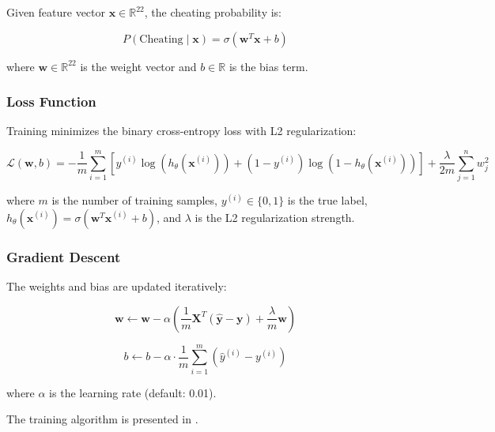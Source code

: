 \documentclass{article}
\begin{document}
Given feature vector $\mathbf{x} \in \mathbb{R}^{22}$, the cheating probability is:

\begin{equation}
    P(\text{Cheating} \mid \mathbf{x}) = \sigma(\mathbf{w}^T \mathbf{x} + b)
    \label{eq:logistic_prediction}
\end{equation}

where $\mathbf{w} \in \mathbb{R}^{22}$ is the weight vector and $b \in \mathbb{R}$ is the bias term.

\subsubsection{Loss Function}

Training minimizes the binary cross-entropy loss with L2 regularization:

\begin{equation}
    \mathcal{L}(\mathbf{w}, b) = -\frac{1}{m} \sum_{i=1}^{m} \left[ y^{(i)} \log(h_\theta(\mathbf{x}^{(i)})) + (1 - y^{(i)}) \log(1 - h_\theta(\mathbf{x}^{(i)})) \right] + \frac{\lambda}{2m} \sum_{j=1}^{n} w_j^2
    \label{eq:cross_entropy}
\end{equation}

where $m$ is the number of training samples, $y^{(i)} \in \{0, 1\}$ is the true label, $h_\theta(\mathbf{x}^{(i)}) = \sigma(\mathbf{w}^T \mathbf{x}^{(i)} + b)$, and $\lambda$ is the L2 regularization strength.

\subsubsection{Gradient Descent}

The weights and bias are updated iteratively:

\begin{equation}
    \mathbf{w} \leftarrow \mathbf{w} - \alpha \left( \frac{1}{m} \mathbf{X}^T (\hat{\mathbf{y}} - \mathbf{y}) + \frac{\lambda}{m} \mathbf{w} \right)
    \label{eq:weight_update}
\end{equation}

\begin{equation}
    b \leftarrow b - \alpha \cdot \frac{1}{m} \sum_{i=1}^{m} (\hat{y}^{(i)} - y^{(i)})
    \label{eq:bias_update}
\end{equation}

where $\alpha$ is the learning rate (default: 0.01).

The training algorithm is presented in .
\end{document}
